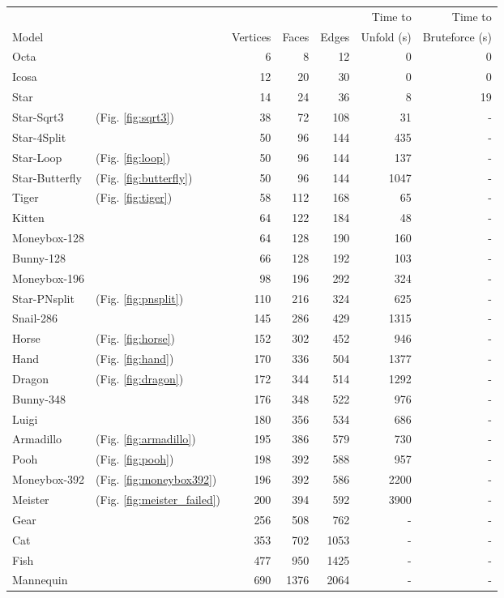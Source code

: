 \documentclass[draft,final]{vutinfth} %
\begin{document}
\begingroup
\centering
\begin{tabular}{|ll|rrr|r|r|}
\hline
& & & & &  Time to & Time to \\
Model & & Vertices & Faces & Edges & Unfold (s) & Bruteforce (s) \\
\hline
Octa & & 6 & 8 & 12 & 0 & 0 \\
Icosa & & 12& 20& 30 & 0 & 0 \\
Star & & 14& 24& 36 & 8 & 19 \\
Star-Sqrt3 & (Fig. \ref{fig:sqrt3}) & 38& 72& 108 & 31 & - \\
Star-4Split & & 50& 96& 144 & 435 & -\\
Star-Loop & (Fig. \ref{fig:loop}) & 50& 96& 144 & 137 & -\\
Star-Butterfly & (Fig. \ref{fig:butterfly}) & 50& 96& 144 & 1047 & -\\
Tiger & (Fig. \ref{fig:tiger}) & 58& 112& 168 & 65 & -\\
Kitten & & 64& 122& 184 & 48 &- \\
Moneybox-128 & & 64& 128& 190 & 160 &- \\
Bunny-128 & & 66& 128& 192 & 103 &- \\
Moneybox-196 & & 98& 196& 292 & 324  &-\\
Star-PNsplit & (Fig. \ref{fig:pnsplit}) & 110& 216& 324 & 625 & -\\
Snail-286 & & 145& 286& 429 & 1315 & -\\
Horse & (Fig. \ref{fig:horse}) & 152& 302& 452 & 946  &-\\
Hand & (Fig. \ref{fig:hand}) & 170& 336& 504 & 1377  &-\\
Dragon & (Fig. \ref{fig:dragon}) & 172& 344& 514 & 1292  &-\\
Bunny-348 & & 176& 348& 522 & 976  &-\\
Luigi & & 180& 356& 534 & 686  &-\\
Armadillo & (Fig. \ref{fig:armadillo}) & 195& 386& 579 & 730  &-\\
Pooh & (Fig. \ref{fig:pooh}) & 198& 392& 588 & 957 &- \\
Moneybox-392 & (Fig. \ref{fig:moneybox392}) & 196& 392& 586 & 2200  &-\\
Meister & (Fig. \ref{fig:meister_failed}) & 200& 394& 592 & 3900 & - \\
Gear & & 256& 508& 762 & - &- \\
Cat & & 353& 702& 1053 & -  &-\\
Fish & & 477& 950& 1425 & -  &-\\
Mannequin & & 690& 1376& 2064 & -  &-\\
\hline
\end{tabular}
\end{document}
